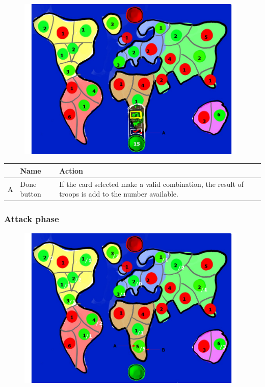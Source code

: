 \documentclass[12pt,a4paper]{article}
\begin{document}
\begin{figure}[H]
  \centering
  \includegraphics[width=11cm]{pic/mocks/5-2.pdf}
\end{figure}

\begin{table}[H]
\small
\centering
\begin{tabular}{c|p{5cm}|p{7cm}}
& Name & Action \\ \hline\hline
A
&Done button
&If the card selected make a valid combination, the result of troops is add to the number available.
\end{tabular}
\end{table}

\subsubsection{Attack phase}

\begin{figure}[H]
  \centering
  \includegraphics[width=11cm]{pic/mocks/5-3.pdf}
\end{figure}
\end{document}
